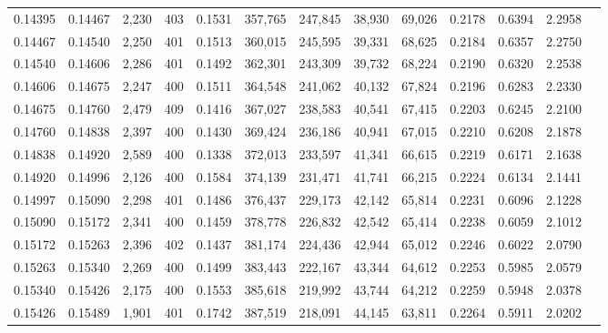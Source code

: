 \begin{tabular}{rrrrrrrrrrrrr}
0.14395 & 0.14467 &  2,230 & 403 &                                     0.1531 & 357,765 & 247,845 &  38,930 &  69,026 & 0.2178 & 0.6394 & 2.2958 \\
0.14467 & 0.14540 &  2,250 & 401 &                                     0.1513 & 360,015 & 245,595 &  39,331 &  68,625 & 0.2184 & 0.6357 & 2.2750 \\
0.14540 & 0.14606 &  2,286 & 401 &                                     0.1492 & 362,301 & 243,309 &  39,732 &  68,224 & 0.2190 & 0.6320 & 2.2538 \\
0.14606 & 0.14675 &  2,247 & 400 &                                     0.1511 & 364,548 & 241,062 &  40,132 &  67,824 & 0.2196 & 0.6283 & 2.2330 \\
0.14675 & 0.14760 &  2,479 & 409 &                                     0.1416 & 367,027 & 238,583 &  40,541 &  67,415 & 0.2203 & 0.6245 & 2.2100 \\
0.14760 & 0.14838 &  2,397 & 400 &                                     0.1430 & 369,424 & 236,186 &  40,941 &  67,015 & 0.2210 & 0.6208 & 2.1878 \\
0.14838 & 0.14920 &  2,589 & 400 &                                     0.1338 & 372,013 & 233,597 &  41,341 &  66,615 & 0.2219 & 0.6171 & 2.1638 \\
0.14920 & 0.14996 &  2,126 & 400 &                                     0.1584 & 374,139 & 231,471 &  41,741 &  66,215 & 0.2224 & 0.6134 & 2.1441 \\
0.14997 & 0.15090 &  2,298 & 401 &                                     0.1486 & 376,437 & 229,173 &  42,142 &  65,814 & 0.2231 & 0.6096 & 2.1228 \\
0.15090 & 0.15172 &  2,341 & 400 &                                     0.1459 & 378,778 & 226,832 &  42,542 &  65,414 & 0.2238 & 0.6059 & 2.1012 \\
0.15172 & 0.15263 &  2,396 & 402 &                                     0.1437 & 381,174 & 224,436 &  42,944 &  65,012 & 0.2246 & 0.6022 & 2.0790 \\
0.15263 & 0.15340 &  2,269 & 400 &                                     0.1499 & 383,443 & 222,167 &  43,344 &  64,612 & 0.2253 & 0.5985 & 2.0579 \\
0.15340 & 0.15426 &  2,175 & 400 &                                     0.1553 & 385,618 & 219,992 &  43,744 &  64,212 & 0.2259 & 0.5948 & 2.0378 \\
0.15426 & 0.15489 &  1,901 & 401 &                                     0.1742 & 387,519 & 218,091 &  44,145 &  63,811 & 0.2264 & 0.5911 & 2.0202 \\

\end{tabular}
